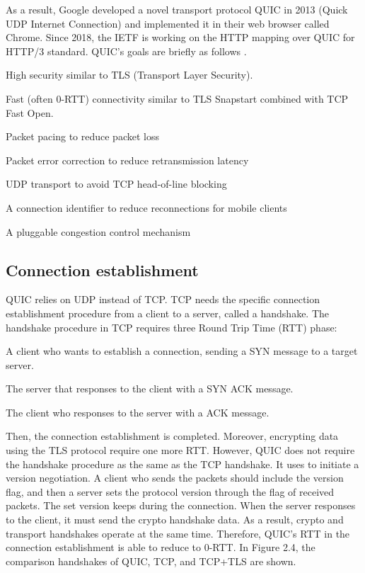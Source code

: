As a result, Google developed a novel transport protocol QUIC in 2013 (Quick UDP Internet Connection) and implemented it in their web browser called Chrome. Since 2018, the IETF is working on the HTTP mapping over QUIC for HTTP/3 standard. QUIC’s goals are briefly as follows \cite{experimentingwithquic}.

\begin{description}
	\item High security similar to TLS (Transport Layer Security).
	\item Fast (often 0-RTT) connectivity similar to TLS Snapstart combined with TCP Fast Open.
	\item Packet pacing to reduce packet loss
	\item Packet error correction to reduce retransmission latency
	\item UDP transport to avoid TCP head-of-line blocking
	\item A connection identifier to reduce reconnections for mobile clients
	\item A pluggable congestion control mechanism
	
\end{description}

\subsection{Connection establishment}

QUIC relies on UDP instead of TCP. TCP needs the specific connection establishment procedure from a client to a server, called a handshake. The handshake procedure in TCP requires three Round Trip Time (RTT) phase:

\begin{description}
	\item A client who wants to establish a connection, sending a SYN message to a target server.
	\item The server that responses to the client with a SYN ACK message.
	\item The client who responses to the server with a ACK message.
\end{description}

Then, the connection establishment is completed. Moreover, encrypting data using the TLS protocol require one more RTT. However, QUIC does not require the handshake procedure as the same as the TCP handshake. It uses to initiate a version negotiation. A client who sends the packets should include the version flag, and then a server sets the protocol version through the flag of received packets. The set version keeps during the connection. When the server responses to the client, it must send the crypto handshake data. As a result, crypto and transport handshakes operate at the same time. Therefore, QUIC’s RTT in the connection establishment is able to reduce to 0-RTT. In Figure 2.4, the comparison handshakes of QUIC, TCP, and TCP+TLS are shown.

